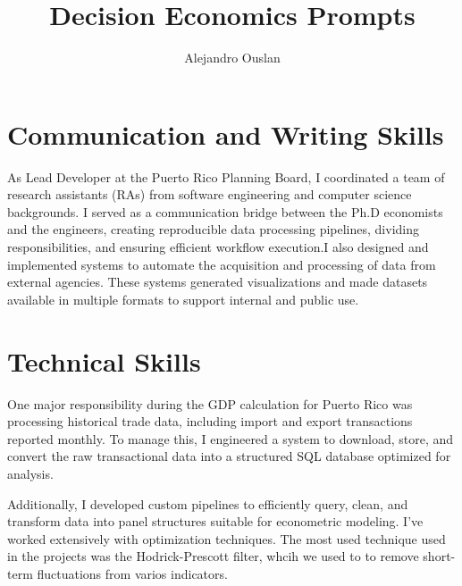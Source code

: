 \documentclass[10pt, oneside]{article}
\title{Decision Economics Prompts}
\author{Alejandro Ouslan}
\begin{document}
\maketitle

\vspace{.25in}

\section{Communication and Writing Skills}


As Lead Developer at the Puerto Rico Planning Board, I coordinated a team of research assistants (RAs) from software engineering and computer science backgrounds.
I served as a communication bridge between the Ph.D economists and the engineers, creating reproducible data processing pipelines, dividing responsibilities,
and ensuring efficient workflow execution.I also designed and implemented systems to automate the acquisition and processing of data from external agencies.
These systems generated visualizations and made datasets available in multiple formats to support internal and public use.

\section{Technical Skills}


One major responsibility during the GDP calculation for Puerto Rico was processing historical trade data, including import and export transactions
reported monthly. To manage this, I engineered a system to download, store, and convert the raw transactional data into a structured SQL database
optimized for analysis.

Additionally, I developed custom pipelines to efficiently query, clean, and transform data into panel structures suitable for econometric modeling.
I’ve worked extensively with optimization techniques. The most used technique used in the projects was the Hodrick-Prescott filter, whcih we used to
to remove short-term fluctuations from varios indicators.
\end{document}
